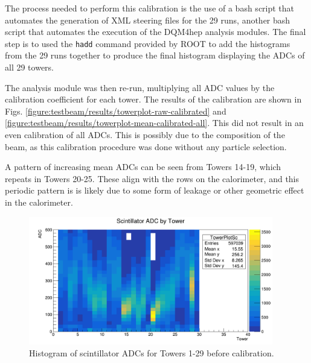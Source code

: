 The process needed to perform this calibration is the use of a bash script that automates the generation of XML steering files for the 29 runs, another bash script that automates the execution of the DQM4hep analysis modules. The final step is to used the \texttt{hadd} command provided by ROOT to add the histograms from the 29 runs together to produce the final histogram displaying the ADCs of all 29 towers.

The analysis module was then re-run, multiplying all ADC values by the calibration coefficient for each tower. The results of the calibration are shown in Figs. \ref{figure:testbeam/results/towerplot-raw-calibrated} and \ref{figure:testbeam/results/towerplot-mean-calibrated-all}. This did not result in an even calibration of all \acrshort{ADC}s. This is possibly due to the composition of the beam, as this calibration procedure was done without any particle selection.

A pattern of increasing mean ADCs can be seen from Towers 14-19, which repeats in Towers 20-25. These align with the rows on the calorimeter, and this periodic pattern is is likely due to some form of leakage or other geometric effect in the calorimeter. 

\begin{figure}[hp]
	\centering
	\includegraphics[width=0.95\textwidth]{../Pictures/IDEA/Calibration/new-towerplot-density-uncalibrated.png}
	\caption{Histogram of scintillator \acrshort{ADC}s for Towers 1-29 before calibration.}
	\label{figure:testbeam/results/towerplot-raw-uncalibrated}
\end{figure}

